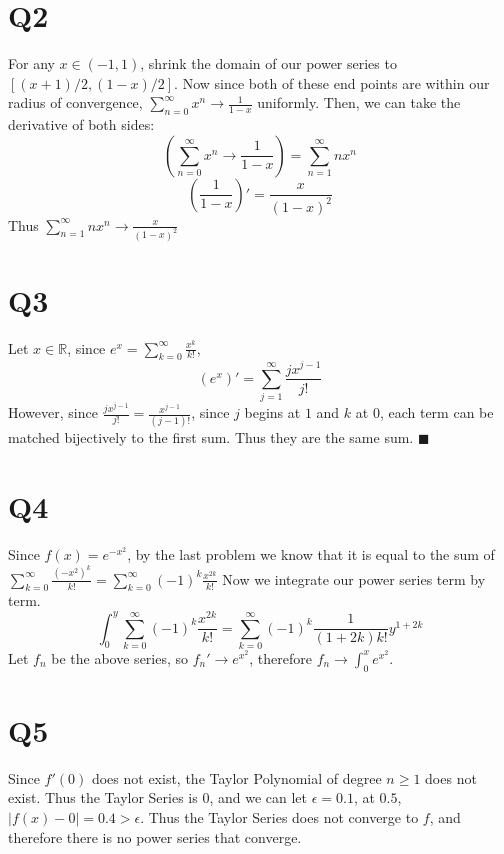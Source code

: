 \documentclass[12pt]{article}
\newcommand{\R}{\mathbb{R}}
\begin{document}
\section{Q2}
For any $x \in (-1,1)$, shrink the domain of our power series to $[(x+1)/2, (1-x)/2]$. Now since both of these end points are within our radius of convergence, $\sum_{n=0}^{\infty}x^n \to \frac{1}{1-x}$ uniformly.
\newline
Then, we can take the derivative of both sides:
$$(\sum_{n=0}^{\infty}x^n \to \frac{1}{1-x}) = \sum_{n=1}^{\infty}nx^n$$
$$(\frac{1}{1-x})' = \frac{x}{(1-x)^2}$$
Thus $\sum_{n=1}^{\infty}nx^n \to \frac{x}{(1-x)^2}$
\newpage


\section{Q3}
Let $x \in \R$, since $e^x = \sum_{k=0}^{\infty}\frac{x^k}{k!}$,
$$(e^x)' = \sum_{j=1}^{\infty}\frac{jx^{j-1}}{j!}$$
However, since $\frac{jx^{j-1}}{j!} = \frac{x^{j-1}}{(j-1)!}$, since $j$ begins at $1$ and $k$ at $0$, each term can be matched bijectively to the first sum.
\newline
Thus they are the same sum. $\blacksquare$
\newpage


\section{Q4}
Since $f(x)=e^{-x^2}$, by the last problem we know that it is equal to the sum of $\sum_{k=0}^{\infty}\frac{(-x^2)^k}{k!} = \sum_{k=0}^{\infty}(-1)^k\frac{x^{2k}}{k!}$
\newline
Now we integrate our power series term by term.
$$\int_0^y \sum_{k=0}^{\infty}(-1)^k\frac{x^{2k}}{k!} = \sum_{k=0}^{\infty}(-1)^{k}\frac{1}{(1+2k)k!}y^{1+2k}$$
Let $f_n$ be the above series, so $f_n' \to e^{{x^2}}$, therefore $f_n \to \int_0^x e^{{x^2}}$.
\newpage


\section{Q5}
Since $f'(0)$ does not exist, the Taylor Polynomial of degree $n \geq 1$ does not exist. Thus the Taylor Series is $0$, and we can let $\epsilon = 0.1$, at $0.5$, $|f(x)-0| = 0.4 > \epsilon$. Thus the Taylor Series does not converge to $f$, and therefore there is no power series that converge.
\newpage
\end{document}
